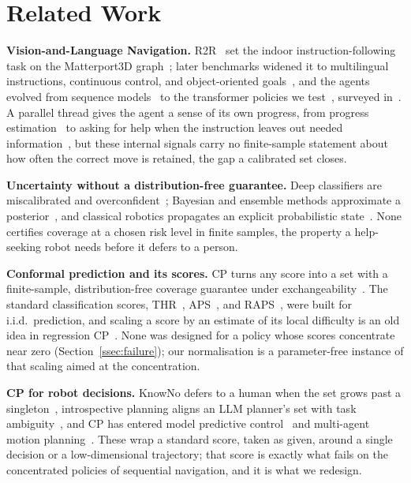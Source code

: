 \section{Related Work}
\label{sec:related}

\textbf{Vision-and-Language Navigation.}
R2R~\cite{anderson2018r2r} set the indoor instruction-following task on the
Matterport3D graph~\cite{chang2017matterport}; later benchmarks widened it to
multilingual instructions, continuous control, and object-oriented
goals~\cite{ku2020rxr,krantz2020vlnce,zhu2021soon}, and the agents evolved
from sequence models~\cite{fried2018speakerfollower,tan2019envdrop} to the
transformer policies we test~\cite{chen2022duet,chen2021hamt,hong2021vlnbert},
surveyed in~\cite{zhang2024survey}. A parallel thread gives the agent a sense
of its own progress, from progress estimation~\cite{ma2019selfmonitoring} to
asking for help when the instruction leaves out needed
information~\cite{abraham2025ask}, but these internal signals carry no
finite-sample statement about how often the correct move is retained, the
gap a calibrated set closes.

\textbf{Uncertainty without a distribution-free guarantee.}
Deep classifiers are miscalibrated and
overconfident~\cite{guo2017calibration}; Bayesian and ensemble methods
approximate a posterior~\cite{gal2016dropout,lakshminarayanan2017ensembles},
and classical robotics propagates an explicit probabilistic
state~\cite{thrun2005probabilistic}. None certifies coverage at a chosen risk
level in finite samples, the property a help-seeking robot needs before it
defers to a person.

\textbf{Conformal prediction and its scores.}
CP turns any score into a set with a finite-sample, distribution-free
coverage guarantee under
exchangeability~\cite{vovk2005alrw,lei2018distributionfree,angelopoulos2023gentle}.
The standard classification scores, THR~\cite{sadinle2019least},
APS~\cite{romano2020aps}, and RAPS~\cite{angelopoulos2021raps}, were built
for i.i.d.\ prediction, and scaling a score by an estimate of its local
difficulty is an old idea in regression
CP~\cite{papadopoulos2011normalized}. None was designed for a policy whose
scores concentrate near zero (Section~\ref{ssec:failure}); our normalisation
is a parameter-free instance of that scaling aimed at the concentration.

\textbf{CP for robot decisions.}
KnowNo defers to a human when the set grows past a
singleton~\cite{ren2023knowno}, introspective planning aligns an LLM
planner's set with task ambiguity~\cite{liang2024introspective}, and CP has
entered model predictive control~\cite{lindemann2023conformal} and
multi-agent motion planning~\cite{dixit2023multiagent}. These wrap a standard
score, taken as given, around a single decision or a low-dimensional
trajectory; that score is exactly what fails on the concentrated policies of
sequential navigation, and it is what we redesign.

